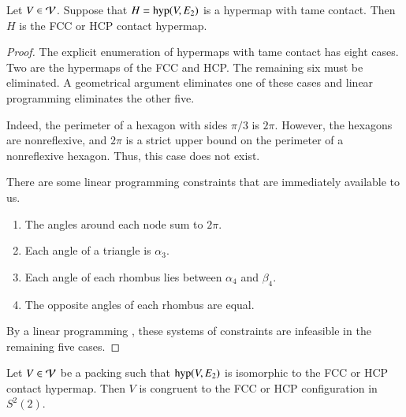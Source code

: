 \documentclass{llncs}
\def\op#1{{\hbox{#1}}}
\begin{document}
\begin{lemma}\label{lemma:fcc-ft} Let $V\in {\mathcal V}$.
  Suppose that $H=\op{hyp}(V,E_{2})$ is a hypermap with tame
  contact.  Then $H$ is the FCC or HCP contact hypermap.
\end{lemma}

\begin{proof} The explicit enumeration of hypermaps with tame
  contact has eight cases.  Two are the hypermaps of the
  FCC and HCP.  The remaining six must be eliminated.  
A geometrical argument  eliminates one of these cases and linear programming
eliminates the other five.

  Indeed, the perimeter of a hexagon with sides $\pi/3$
is $2\pi$.  However, the hexagons are nonreflexive, and $2\pi$ is a strict upper bound on the perimeter of a nonreflexive
hexagon.  Thus, this case does not exist.



There are some linear
  programming constraints that are immediately available to us.
\begin{enumerate}\wasitemize 
\item The angles around each node sum to $2\pi$.
\item Each angle of a triangle is $\alpha_3$.
\item Each angle of each rhombus lies between $\alpha_4$ and $\beta_4$.
\item The opposite angles of each rhombus are equal.
\end{enumerate}\wasitemize 
By a linear programming ,
these systems of constraints are infeasible in the remaining five cases.
\end{proof}


\begin{lemma}\label{lemma:kiss-fcc}
  Let $V\in {\mathcal V}$ be a packing such that $\op{hyp}(V,E_{2})$ is
  isomorphic to the FCC or HCP contact hypermap.  Then $V$ is
  congruent to the FCC or HCP configuration in $S^2(2)$.
\end{lemma}
%
%
%
%
\end{document}
